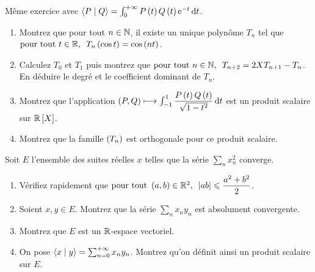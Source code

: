 \begin{exoss}
Même exercice avec \(\ps{P}{Q}=\int_0^{\pinf}P\paren{t}Q\paren{t}\e{-t}\odif{t}\).
\end{exoss}

\begin{exoss}
\begin{enumerate}
    \item Montrez que pour tout \(n\in\mathbb{N}\), il existe un unique polynôme \(T_n\) tel que \(\quantifs{\tpt t\in\R}T_n\paren{\cos t}=\cos\paren{nt}\). \\
    \item Calculez \(T_0\) et \(T_1\) puis montrez que \(\quantifs{\tpt n\in\N}T_{n+2}=2XT_{n+1}-T_n\). En déduire le degré et le coefficient dominant de \(T_n\). \\
    \item Montrez que l'application \(\paren{P,Q}\mapsto\int_{-1}^1\dfrac{P\paren{t}Q\paren{t}}{\sqrt{1-t^2}}\odif{t}\) est un produit scalaire sur \(\poly[\R]\). \\
    \item Montrez que la famille \(\left(T_n\right)\) est orthogonale pour ce produit scalaire.
\end{enumerate}
\end{exoss}

\begin{exoss}
Soit \(E\) l'ensemble des suites réelles \(x\) telles que la série \(\sum_nx_n^2\) converge.

\begin{enumerate}
    \item Vérifiez rapidement que \(\quantifs{\tpt\paren{a,b}\in\R^2}\abs{ab}\leq\dfrac{a^2+b^2}{2}\). \\
    \item Soient \(x,y\in E\). Montrez que la série \(\sum_nx_ny_n\) est absolument convergente. \\
    \item Montrez que \(E\) est un \(\mathbb{R}\)-espace vectoriel. \\
    \item On pose \(\left\langle x\;\middle|\; y\right\rangle=\sum_{n=0}^{+\infty}x_ny_n\). Montrez qu'on définit ainsi un produit scalaire sur \(E\).
\end{enumerate}
\end{exoss}

